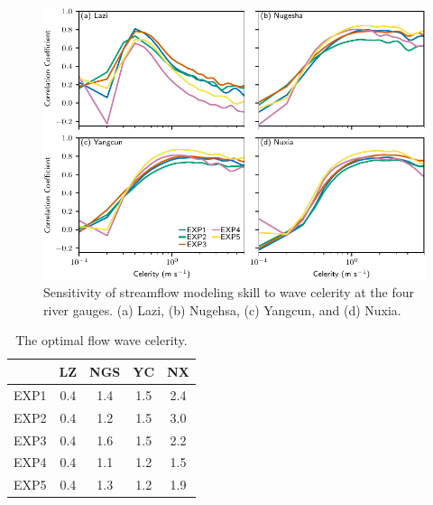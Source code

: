 \documentclass[draft]{agujournal2019}
\begin{document}
\begin{figure}[h!]
      \centering
      \noindent\includegraphics[width=140mm]{q_sens_cc.pdf}
      \caption{Sensitivity of streamflow modeling skill to wave celerity at the four river gauges. (a) Lazi, (b) Nugehsa, (c) Yangcun, and (d) Nuxia. \label{fig:celerity}}
\end{figure}

\begin{table}[h!]
      \centering
      \doublerulesep 0.3pt
      \renewcommand{\arraystretch}{1}  %
      \caption{The optimal flow wave celerity.}
      \label{tab:celerity}
      \vspace*{5mm}
      \small
      \begin{tabular*}{50mm}{ccccc}
            \hline
            & LZ & NGS & YC & NX \\
            \hline
            EXP1 & 0.4 & 1.4 & 1.5 & 2.4 \\
            EXP2 & 0.4 & 1.2 & 1.5 & 3.0 \\
            EXP3 & 0.4 & 1.6 & 1.5 & 2.2 \\
            EXP4 & 0.4 & 1.1 & 1.2 & 1.5 \\
            EXP5 & 0.4 & 1.3 & 1.2 & 1.9 \\
            \hline
      \end{tabular*}
      \renewcommand{\arraystretch}{1}  %
\end{table}
\end{document}
